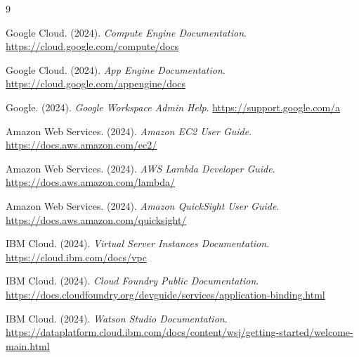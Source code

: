 \documentclass[11pt,a4paper]{article}
\begin{document}
\begin{thebibliography}{9}

Google Cloud. (2024). \textit{Compute Engine Documentation}. \url{https://cloud.google.com/compute/docs}

Google Cloud. (2024). \textit{App Engine Documentation}. \url{https://cloud.google.com/appengine/docs}

Google. (2024). \textit{Google Workspace Admin Help}. \url{https://support.google.com/a}

Amazon Web Services. (2024). \textit{Amazon EC2 User Guide}. \url{https://docs.aws.amazon.com/ec2/}

Amazon Web Services. (2024). \textit{AWS Lambda Developer Guide}. \url{https://docs.aws.amazon.com/lambda/}

Amazon Web Services. (2024). \textit{Amazon QuickSight User Guide}. \url{https://docs.aws.amazon.com/quicksight/}

IBM Cloud. (2024). \textit{Virtual Server Instances Documentation}. \url{https://cloud.ibm.com/docs/vpc}

IBM Cloud. (2024). \textit{Cloud Foundry Public Documentation}. \url{https://docs.cloudfoundry.org/devguide/services/application-binding.html }

IBM Cloud. (2024). \textit{Watson Studio Documentation}. \url{https://dataplatform.cloud.ibm.com/docs/content/wsj/getting-started/welcome-main.html}

\end{thebibliography}
\end{document}
